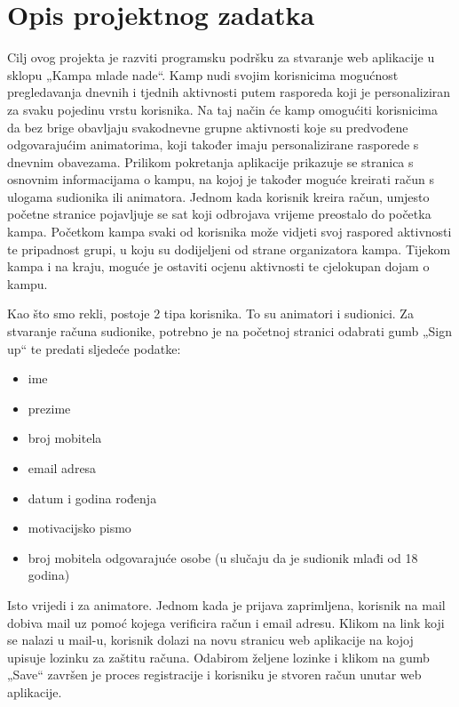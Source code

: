 \chapter{Opis projektnog zadatka}
		
		Cilj ovog projekta je razviti programsku podršku za stvaranje web aplikacije u sklopu „Kampa mlade nade“. Kamp nudi svojim korisnicima mogućnost pregledavanja dnevnih i tjednih aktivnosti putem rasporeda koji je personaliziran za svaku pojedinu vrstu korisnika.                    Na taj način će kamp omogućiti korisnicima da bez brige obavljaju svakodnevne grupne aktivnosti koje su predvođene odgovarajućim animatorima, koji također imaju personalizirane rasporede s dnevnim obavezama.
    Prilikom pokretanja aplikacije prikazuje se stranica s osnovnim informacijama o kampu, na kojoj je također moguće kreirati račun s ulogama sudionika ili animatora. Jednom kada korisnik kreira račun, umjesto početne stranice pojavljuje se sat koji odbrojava vrijeme preostalo do početka kampa. Početkom kampa svaki od korisnika može vidjeti svoj raspored aktivnosti  te pripadnost grupi, u koju su dodijeljeni od strane organizatora kampa. Tijekom kampa i na kraju, moguće je ostaviti ocjenu aktivnosti te cjelokupan dojam o kampu.

    Kao što smo rekli, postoje 2 tipa korisnika. To su animatori i sudionici. Za stvaranje računa sudionike, potrebno je na početnoj stranici odabrati gumb „Sign up“  te predati sljedeće podatke:

    \begin{itemize}
        \item ime
        \item prezime
        \item broj mobitela
        \item email adresa
        \item datum i godina rođenja
        \item motivacijsko pismo
        \item broj mobitela odgovarajuće osobe (u slučaju da je sudionik mlađi od 18 godina)
    \end{itemize}
    \pagebreak
    Isto vrijedi i za animatore. Jednom kada je prijava zaprimljena, korisnik na mail dobiva mail uz pomoć kojega verificira račun i email adresu. Klikom na link koji se nalazi u mail-u, korisnik dolazi na novu stranicu web aplikacije na kojoj upisuje lozinku za zaštitu računa. Odabirom željene lozinke i klikom na gumb „Save“ završen je proces registracije i korisniku je stvoren račun unutar web aplikacije.

